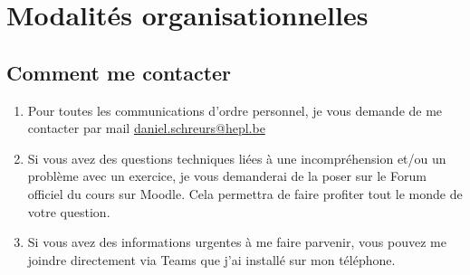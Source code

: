 \section{Modalités organisationnelles}
\subsection{Comment me contacter}
\begin{enumerate}
    \item Pour toutes les communications d'ordre personnel, je vous demande de me contacter par mail \href{mailto:daniel.schreurs@hepl.be}{daniel.schreurs@hepl.be}
    \item Si vous avez des questions techniques liées à une incompréhension et/ou un problème avec un exercice, je vous demanderai de la poser sur le Forum officiel du cours sur Moodle. Cela permettra de faire profiter tout le monde de votre question.
    \item Si vous avez des informations urgentes à me faire parvenir, vous pouvez me joindre directement via Teams que j'ai installé sur mon téléphone.
\end{enumerate}


\clearpage
\printbibliography


